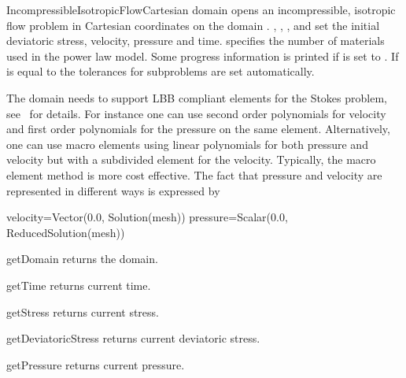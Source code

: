 \begin{classdesc}{IncompressibleIsotropicFlowCartesian}{
domain
}
opens an incompressible, isotropic flow problem in Cartesian coordinates on
the domain .
, , , and  set the initial deviatoric stress,
velocity, pressure and time.
 specifies the number of materials used in the power law
model. Some progress information is printed if  is set to \True.
If  is equal to \True the tolerances for subproblems
are set automatically.

The domain needs to support LBB compliant elements for the Stokes problem,
see~\cite{LBB} for details.
For instance one can use second order polynomials for velocity and first order
polynomials for the pressure on the same element. Alternatively, one can use
macro elements using linear polynomials for both
pressure and velocity but with a subdivided element for the velocity.
Typically, the macro element method is more cost effective.
The fact that pressure and velocity are represented in different ways is
expressed by
\begin{python}
  velocity=Vector(0.0, Solution(mesh))
  pressure=Scalar(0.0, ReducedSolution(mesh))
\end{python}
\end{classdesc}

\begin{methoddesc}[IncompressibleIsotropicFlowCartesian]{getDomain}{}
returns the domain.
\end{methoddesc}

\begin{methoddesc}[IncompressibleIsotropicFlowCartesian]{getTime}{}
returns current time.
\end{methoddesc}

\begin{methoddesc}[IncompressibleIsotropicFlowCartesian]{getStress}{}
returns current stress.
\end{methoddesc}

\begin{methoddesc}[IncompressibleIsotropicFlowCartesian]{getDeviatoricStress}{}
returns current deviatoric stress.
\end{methoddesc}

\begin{methoddesc}[IncompressibleIsotropicFlowCartesian]{getPressure}{}
returns current pressure.
\end{methoddesc}

